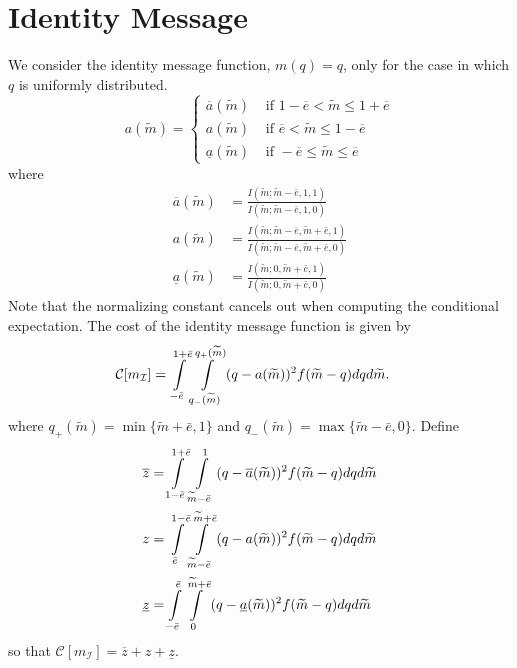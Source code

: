 \documentclass[12pt]{article}
\begin{document}
\section{Identity Message}
We consider the identity message function, $m(q)=q$, only for the case in which $q$ is uniformly distributed. 
\begin{equation}
	a(\widetilde{m})=
	\begin{cases}
		\overline{a}(\widetilde{m}) & \text{ if } 1-\overline{e}<\widetilde{m}\leq 1+\overline{e}\\
		a(\widetilde{m}) & \text{ if } \overline{e}<\widetilde{m}\leq 1-\overline{e}\\
		\underline{a}(\widetilde{m}) & \text{ if } -\overline{e}\leq\widetilde{m}\leq \overline{e}
	\end{cases}
\end{equation}
where
\begin{align}
	\overline{a}(\widetilde{m})&=\frac{I(\widetilde{m};\widetilde{m}-\bar{e},1,1)}{I(\widetilde{m};\widetilde{m}-\bar{e},1,0)}\\
	a(\widetilde{m})&=\frac{I(\widetilde{m};\widetilde{m}-\bar{e},\widetilde{m}+\bar{e},1)}{I(\widetilde{m};\widetilde{m}-\bar{e},\widetilde{m}+\bar{e},0)}\\
	\underline{a}(\widetilde{m})&=\frac{I(\widetilde{m};0,\widetilde{m}+\bar{e},1)}{I(\widetilde{m};0,\widetilde{m}+\bar{e},0)}
\end{align}
Note that the normalizing constant cancels out when computing the conditional expectation. The cost of the identity message function is given by
\begin{align}
	\mathcal{C}[m_{\mathcal{I}}]&=\int\displaylimits_{-\bar{e}}^{1+\bar{e}}{\int\displaylimits_{q_{-}(\widetilde{m})}^{q_{+}(\widetilde{m})}{(q-a(\widetilde{m}))^{2}f(\widetilde{m}-q)dq}d\widetilde{m}}.
\end{align}
where $q_{+}(\widetilde{m})=\min\{\widetilde{m}+\bar{e},1\}$ and $q_{-}(\widetilde{m})=\max\{\widetilde{m}-\bar{e},0\}$. Define
\begin{align}
	\overline{z}&=\int\displaylimits_{1-\bar{e}}^{1+\bar{e}}{\int\displaylimits_{\widetilde{m}-\bar{e}}^{1}{(q-\overline{a}(\widetilde{m}))^{2}f(\widetilde{m}-q)dq}d\widetilde{m}}\\
	z&=\int\displaylimits_{\bar{e}}^{1-\bar{e}}{\int\displaylimits_{\widetilde{m}-\bar{e}}^{\widetilde{m}+\bar{e}}{(q-a(\widetilde{m}))^{2}f(\widetilde{m}-q)dq}d\widetilde{m}}\\
	\underline{z}&=\int\displaylimits_{-\bar{e}}^{\bar{e}}{\int\displaylimits_{0}^{\widetilde{m}+\bar{e}}{(q-\underline{a}(\widetilde{m}))^{2}f(\widetilde{m}-q)dq}d\widetilde{m}}
\end{align}
so that $\mathcal{C}[m_{\mathcal{I}}]=\overline{z}+z+\underline{z}$.
\end{document}
